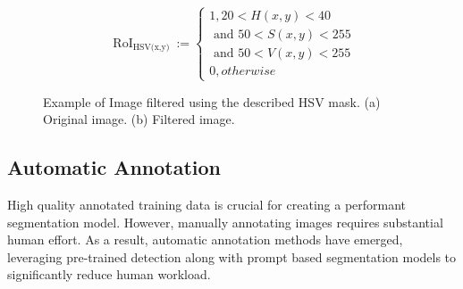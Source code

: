 \documentclass[lettersize,journal]{IEEEtran}
\begin{document}
\[\text{ RoI}_{\text{HSV(x,y) }} := \begin{cases}
        1, 20 < H(x,y) < 40 \\
        \text{ and }50 < S(x,y) < 255 \\
        \text{ and }50 < V(x,y) < 255 \\
        0, otherwise
\end{cases}\]


\begin{figure}[!t]
\centering
{}
\hfil
{}
        \caption{Example of Image filtered using the described HSV mask. (a) Original image. (b) Filtered image.}
\label{hsvimg}
\end{figure}

\subsection{Automatic Annotation}

High quality annotated training data is crucial for creating a performant segmentation model. However, manually annotating images requires substantial human effort. As a result, automatic annotation methods have emerged, leveraging pre-trained detection along with prompt based segmentation models to significantly reduce human workload. 




\newpage


\vfill
\end{document}
